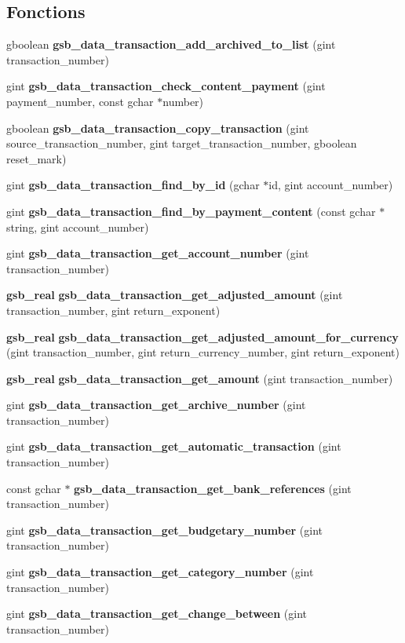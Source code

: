 \subsection*{Fonctions}
\begin{DoxyCompactItemize}
\item 
gboolean {\bf gsb\_\-data\_\-transaction\_\-add\_\-archived\_\-to\_\-list} (gint transaction\_\-number)
\item 
gint {\bf gsb\_\-data\_\-transaction\_\-check\_\-content\_\-payment} (gint payment\_\-number, const gchar $\ast$number)
\item 
gboolean {\bf gsb\_\-data\_\-transaction\_\-copy\_\-transaction} (gint source\_\-transaction\_\-number, gint target\_\-transaction\_\-number, gboolean reset\_\-mark)
\item 
gint {\bf gsb\_\-data\_\-transaction\_\-find\_\-by\_\-id} (gchar $\ast$id, gint account\_\-number)
\item 
gint {\bf gsb\_\-data\_\-transaction\_\-find\_\-by\_\-payment\_\-content} (const gchar $\ast$string, gint account\_\-number)
\item 
gint {\bf gsb\_\-data\_\-transaction\_\-get\_\-account\_\-number} (gint transaction\_\-number)
\item 
{\bf gsb\_\-real} {\bf gsb\_\-data\_\-transaction\_\-get\_\-adjusted\_\-amount} (gint transaction\_\-number, gint return\_\-exponent)
\item 
{\bf gsb\_\-real} {\bf gsb\_\-data\_\-transaction\_\-get\_\-adjusted\_\-amount\_\-for\_\-currency} (gint transaction\_\-number, gint return\_\-currency\_\-number, gint return\_\-exponent)
\item 
{\bf gsb\_\-real} {\bf gsb\_\-data\_\-transaction\_\-get\_\-amount} (gint transaction\_\-number)
\item 
gint {\bf gsb\_\-data\_\-transaction\_\-get\_\-archive\_\-number} (gint transaction\_\-number)
\item 
gint {\bf gsb\_\-data\_\-transaction\_\-get\_\-automatic\_\-transaction} (gint transaction\_\-number)
\item 
const gchar $\ast$ {\bf gsb\_\-data\_\-transaction\_\-get\_\-bank\_\-references} (gint transaction\_\-number)
\item 
gint {\bf gsb\_\-data\_\-transaction\_\-get\_\-budgetary\_\-number} (gint transaction\_\-number)
\item 
gint {\bf gsb\_\-data\_\-transaction\_\-get\_\-category\_\-number} (gint transaction\_\-number)
\item 
gint {\bf gsb\_\-data\_\-transaction\_\-get\_\-change\_\-between} (gint transaction\_\-number)

\end{DoxyCompactItemize}
